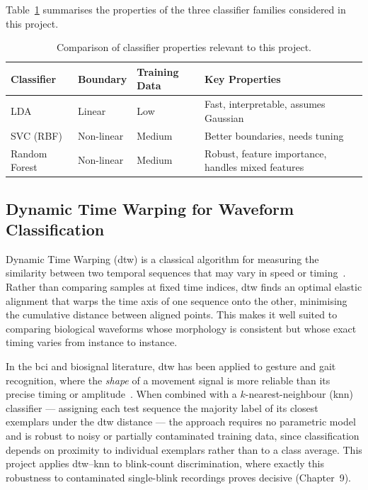Table~\ref{tab:classifier_comparison} summarises the properties of
the three classifier families considered in this project.

\begin{table}[htbp]
\centering
\caption{Comparison of classifier properties relevant to this
project.}
\label{tab:classifier_comparison}
\renewcommand{\arraystretch}{1.3}
\begin{tabular}{p{2.0cm} p{2.2cm} p{1.5cm} p{2.5cm}}
\toprule
\textbf{Classifier} & \textbf{Boundary} &
\textbf{Training Data} & \textbf{Key Properties} \\
\midrule
LDA & Linear & Low & Fast, interpretable, assumes Gaussian \\
SVC (RBF) & Non-linear & Medium & Better boundaries, needs tuning \\
Random Forest & Non-linear & Medium & Robust, feature importance,
    handles mixed features \\
\bottomrule
\end{tabular}
\end{table}

\subsection{Dynamic Time Warping for Waveform Classification}
\label{subsec:dtw_litt}

Dynamic Time Warping (\acrshort{dtw}) is a classical algorithm for
measuring the similarity between two temporal sequences that may vary
in speed or timing~\cite{sakoe1978dtw}. Rather than comparing samples
at fixed time indices, \acrshort{dtw} finds an optimal elastic
alignment that warps the time axis of one sequence onto the other,
minimising the cumulative distance between aligned points. This makes
it well suited to comparing biological waveforms whose morphology is
consistent but whose exact timing varies from instance to instance.

In the \acrshort{bci} and biosignal literature, \acrshort{dtw} has
been applied to gesture and gait recognition, where the \emph{shape}
of a movement signal is more reliable than its precise timing or
amplitude~\cite{berndt1994dtw}. When combined with a
$k$-nearest-neighbour (\acrshort{knn}) classifier --- assigning each
test sequence the majority label of its closest exemplars under the
\acrshort{dtw} distance --- the approach requires no parametric model
and is robust to noisy or partially contaminated training data, since
classification depends on proximity to individual exemplars rather
than to a class average. This project applies \acrshort{dtw}--\acrshort{knn}
to blink-count discrimination, where exactly this robustness to
contaminated single-blink recordings proves decisive (Chapter~9).

